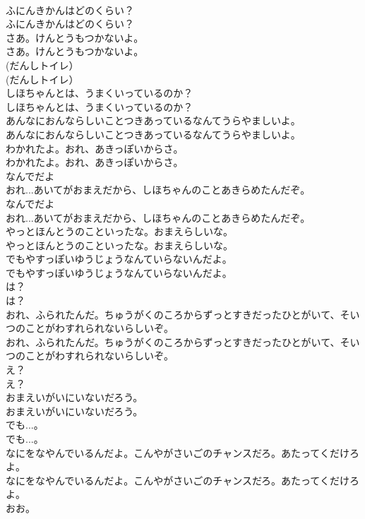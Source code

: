 \documentclass[8pt]{extreport}
\begin{document}
\begin{CJK}{UTF8}{min}
\\	ふにんきかんはどのくらい？
\\	ふにんきかんはどのくらい？
\\	さあ。けんとうもつかないよ。
\\	さあ。けんとうもつかないよ。
\\	(だんしトイレ）
\\	(だんしトイレ）
\\	しほちゃんとは、うまくいっているのか？
\\	しほちゃんとは、うまくいっているのか？
\\	あんなにおんならしいことつきあっているなんてうらやましいよ。
\\	あんなにおんならしいことつきあっているなんてうらやましいよ。
\\	わかれたよ。おれ、あきっぽいからさ。
\\	わかれたよ。おれ、あきっぽいからさ。
\\	なんでだよ
\\	おれ...あいてがおまえだから、しほちゃんのことあきらめたんだぞ。
\\	なんでだよ
\\	おれ...あいてがおまえだから、しほちゃんのことあきらめたんだぞ。
\\	やっとほんとうのこといったな。おまえらしいな。
\\	やっとほんとうのこといったな。おまえらしいな。
\\	でもやすっぽいゆうじょうなんていらないんだよ。
\\	でもやすっぽいゆうじょうなんていらないんだよ。
\\	は？
\\	は？
\\	おれ、ふられたんだ。ちゅうがくのころからずっとすきだったひとがいて、そいつのことがわすれられないらしいぞ。
\\	おれ、ふられたんだ。ちゅうがくのころからずっとすきだったひとがいて、そいつのことがわすれられないらしいぞ。
\\	え？
\\	え？
\\	おまえいがいにいないだろう。
\\	おまえいがいにいないだろう。
\\	でも...。
\\	でも...。
\\	なにをなやんでいるんだよ。こんやがさいごのチャンスだろ。あたってくだけろよ。
\\	なにをなやんでいるんだよ。こんやがさいごのチャンスだろ。あたってくだけろよ。
\\	おお。

\end{CJK}
\end{document}
